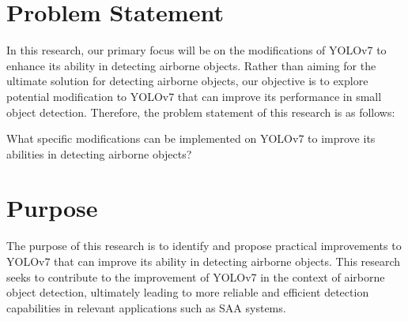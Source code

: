 \section{Problem Statement}
    
    In this research, our primary focus will be on the modifications of YOLOv7 to enhance its ability in detecting airborne objects.
    Rather than aiming for the ultimate solution for detecting airborne objects, our objective is to explore potential modification to YOLOv7 that can improve its performance in small object detection. 
    Therefore, the problem statement of this research is as follows:

    What specific modifications can be implemented on YOLOv7 to improve its abilities in detecting airborne objects?

\section{Purpose}
    The purpose of this research is to identify and propose practical improvements to YOLOv7 that can improve its ability in detecting airborne objects. 
    This research seeks to contribute to the improvement of YOLOv7 in the context of airborne object detection, ultimately leading to more reliable and efficient detection capabilities in relevant applications such as SAA systems.


